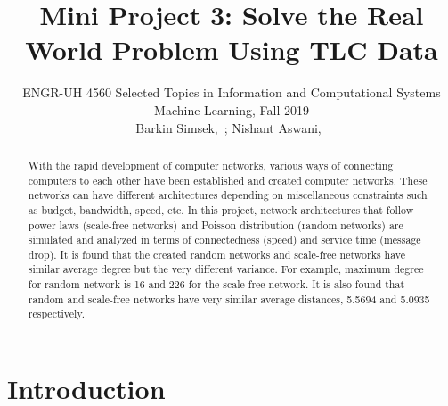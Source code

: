 \documentclass[journal]{IEEEtran}
\begin{document}
{}
\setcounter{page}{1}

\title{Mini Project 3: Solve the Real World Problem Using TLC Data}

\author{ENGR-UH 4560 Selected Topics in  Information and Computational Systems Machine Learning, Fall 2019\\
\medskip
Barkin Simsek,~;
Nishant Aswani,~}%


%
{}

\maketitle

\begin{abstract}
With the rapid development of computer networks, various ways of connecting computers to each other have been established and created computer networks. These networks can have different architectures depending on miscellaneous constraints such as budget, bandwidth, speed, etc. In this project, network architectures that follow power laws (scale-free networks) and Poisson distribution (random networks) are simulated and analyzed in terms of connectedness (speed) and service time (message drop). It is found that the created random networks and scale-free networks have similar average degree but the very different variance. For example, maximum degree for random network is 16 and 226 for the scale-free network. It is also found that random and scale-free networks have very similar average distances, 5.5694 and 5.0935 respectively. 

\end{abstract}

\section{Introduction}
\end{document}
